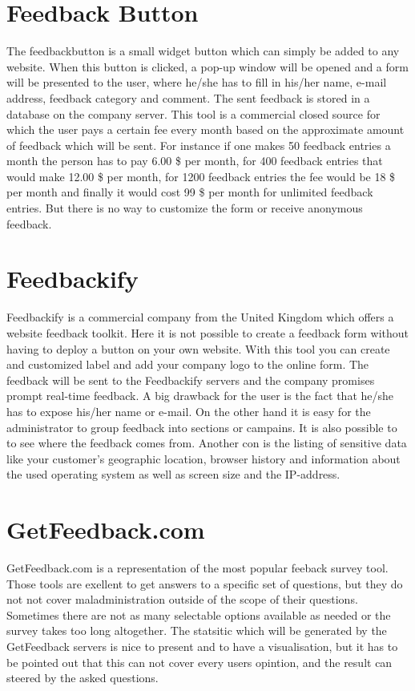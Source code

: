 \section{Feedback Button}
The feedbackbutton is a small widget button which can simply be added to any website. When this button is clicked, a pop-up window will be opened and a form will be presented to the user, where he/she has to fill in his/her name, e-mail address, feedback category and comment. The sent feedback is stored in a database on the company server. This tool is a commercial closed source for which the user pays a certain fee every month based on the approximate amount of feedback which will be sent. For instance  if one makes 50 feedback entries a month the person has to pay 6.00 \$ per month, for 400 feedback entries that would make 12.00 \$ per month, for 1200 feedback entries the fee would be 18 \$ per month and finally it would cost 99 \$ per month for unlimited feedback entries. But there is no way to customize the form or receive anonymous feedback.
 
\section{Feedbackify}
Feedbackify is a commercial company from the United Kingdom which offers a website feedback toolkit. Here it is not possible to create a feedback form without having to deploy a button on your own website. With this tool you can create and customized label and add your company logo to the online form. The feedback will be sent to the Feedbackify servers and the company promises prompt real-time feedback. A big drawback for the user is the fact that he/she has to expose his/her name or e-mail.  On the other hand it is easy for the administrator to group feedback into sections or campains. It is also possible to to see where the feedback comes from. Another con is the listing of sensitive data like your customer's geographic location, browser history and information about the used operating system as well as screen size and the IP-address.

\section{GetFeedback.com}
GetFeedback.com is a representation of the most popular feeback survey tool. Those tools are exellent to get answers to a specific set of questions, but they do not not cover maladministration outside of the scope of their questions. Sometimes there are not as many selectable options available as needed or the survey takes too long altogether. The statsitic which will be generated by the GetFeedback servers is nice to present and to have a visualisation, but it has to be pointed out that this can not cover every users opintion, and the result can steered by the asked questions. 

